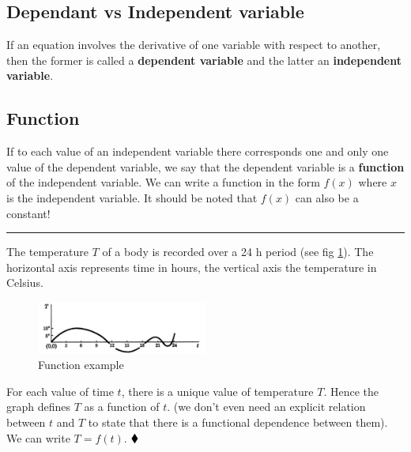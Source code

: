 \subsection*{Dependant vs Independent variable}
If an equation involves the derivative of one variable with respect to another, then the former is called a \textbf{dependent variable} and the latter an \textbf{independent variable}.

\subsection*{Function}
If to each value of an independent variable there corresponds one and only one value of the dependent variable, we say that the dependent variable is a \textbf{function} of the independent variable. We can write a function in the form $f(x)$ where $x$ is the independent variable. It should be noted that $f(x)$ can also be a constant!
\begin{center}
\noindent\rule{4cm}{0.4pt}
\end{center}

\begin{exmp}{}
The temperature $T$ of a body is recorded over a 24 h period (see fig \ref{Fct}). The horizontal axis represents  time in hours, the vertical axis the temperature in Celsius.
\begin{figure}
\centering
\includegraphics[width=0.5\textwidth]{figs/function.pdf} 
\caption{Function example\label{Fct}}
\end{figure}
For each value of time $t$, there is a unique value of temperature $T$. Hence the graph defines $T$ as a function of $t$. (we don't even need an explicit relation between $t$ and $T$ to state that there is a functional dependence between them). We can write $T=f(t)$. $\mathbin{\blacklozenge}$
\end{exmp}


